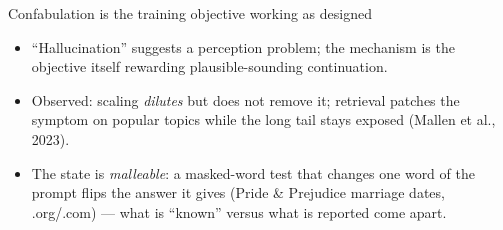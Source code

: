 \documentclass[11pt]{beamer}
\begin{document}
\begin{frame}{Confabulation is the training objective working as designed}
  \begin{itemize}
    \item ``Hallucination'' suggests a perception problem; the mechanism is
          the objective itself rewarding \alert{plausible-sounding continuation}.
    \item Observed: scaling \emph{dilutes} but does not remove it; retrieval
          patches the symptom on popular topics while the long tail stays
          exposed (Mallen et al., 2023).
    \item The state is \emph{malleable}: a masked-word test that changes one
          word of the prompt flips the answer it gives (Pride \& Prejudice
          marriage dates, .org/.com) --- what is ``known'' versus what is
          reported come apart.
  \end{itemize}
\end{frame}
\end{document}
